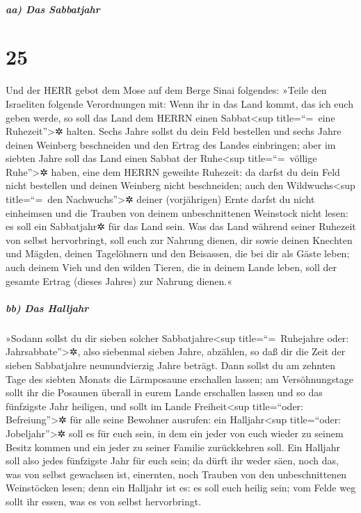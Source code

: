 \hypertarget{aa-das-sabbatjahr}{%
\subparagraph{aa) Das Sabbatjahr}\label{aa-das-sabbatjahr}}

\hypertarget{section-24}{%
\section{25}\label{section-24}}

Und der HERR gebot dem Mose auf dem Berge Sinai folgendes:
»Teile den Israeliten folgende Verordnungen mit: Wenn ihr
in das Land kommt, das ich euch geben werde, so soll das Land dem HERRN
einen Sabbat\textless sup title=``=~eine Ruhezeit''\textgreater✲ halten.
Sechs Jahre sollst du dein Feld bestellen und sechs Jahre
deinen Weinberg beschneiden und den Ertrag des Landes einbringen;
aber im siebten Jahre soll das Land einen Sabbat der
Ruhe\textless sup title=``=~völlige Ruhe''\textgreater✲ haben, eine dem
HERRN geweihte Ruhezeit: da darfst du dein Feld nicht bestellen und
deinen Weinberg nicht beschneiden; auch den
Wildwuchs\textless sup title=``=~den Nachwuchs''\textgreater✲ deiner
(vorjährigen) Ernte darfst du nicht einheimsen und die Trauben von
deinem unbeschnittenen Weinstock nicht lesen: es soll ein Sabbatjahr✲
für das Land sein. Was das Land während seiner Ruhezeit
von selbst hervorbringt, soll euch zur Nahrung dienen, dir sowie deinen
Knechten und Mägden, deinen Tagelöhnern und den Beisassen, die bei dir
als Gäste leben; auch deinem Vieh und den wilden Tieren,
die in deinem Lande leben, soll der gesamte Ertrag (dieses Jahres) zur
Nahrung dienen.«

\hypertarget{bb-das-halljahr}{%
\subparagraph{bb) Das Halljahr}\label{bb-das-halljahr}}

»Sodann sollst du dir sieben solcher
Sabbatjahre\textless sup title=``=~Ruhejahre oder:
Jahrsabbate''\textgreater✲, also siebenmal sieben Jahre, abzählen, so
daß dir die Zeit der sieben Sabbatjahre neunundvierzig Jahre beträgt.
Dann sollst du am zehnten Tage des siebten Monats die
Lärmposaune erschallen lassen; am Versöhnungstage sollt ihr die Posaunen
überall in eurem Lande erschallen lassen und so das
fünfzigste Jahr heiligen, und sollt im Lande Freiheit\textless sup
title=``oder: Befreiung''\textgreater✲ für alle seine Bewohner ausrufen:
ein Halljahr\textless sup title=``oder: Jobeljahr''\textgreater✲ soll es
für euch sein, in dem ein jeder von euch wieder zu seinem Besitz kommen
und ein jeder zu seiner Familie zurückkehren soll. Ein
Halljahr soll also jedes fünfzigste Jahr für euch sein; da dürft ihr
weder säen, noch das, was von selbst gewachsen ist, einernten, noch
Trauben von den unbeschnittenen Weinstöcken lesen; denn
ein Halljahr ist es: es soll euch heilig sein; vom Felde weg sollt ihr
essen, was es von selbst hervorbringt.

